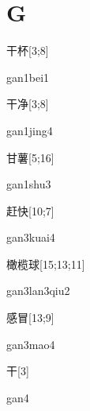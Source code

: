 \section*{G}

\begin{verbete}{干杯}[3;8]
\begin{pronuncia}{gan1bei1}
\end{pronuncia}
\end{verbete}

\begin{verbete}{干净}[3;8]
\begin{pronuncia}{gan1jing4}
\end{pronuncia}
\end{verbete}

\begin{verbete}{甘薯}[5;16]
\begin{pronuncia}{gan1shu3}
\end{pronuncia}
\end{verbete}

\begin{verbete}{赶快}[10;7]
\begin{pronuncia}{gan3kuai4}
\end{pronuncia}
\end{verbete}

\begin{verbete}{橄榄球}[15;13;11]
\begin{pronuncia}{gan3lan3qiu2}
\end{pronuncia}
\end{verbete}

\begin{verbete}{感冒}[13;9]
\begin{pronuncia}{gan3mao4}
\end{pronuncia}
\end{verbete}

\begin{verbete}[gan4]{干}[3]
\begin{pronuncia}{gan4}
\end{pronuncia}
\end{verbete}

